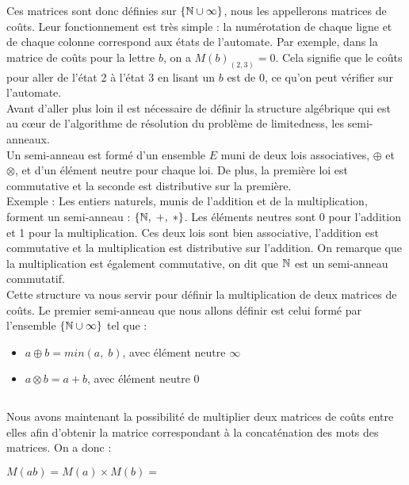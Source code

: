 \documentclass{report}
\begin{document}
Ces matrices sont donc définies sur $\{\mathbb{N} \cup \infty\}$, nous les appellerons matrices de coûts. Leur fonctionnement est très simple : la numérotation de chaque ligne et de chaque colonne correspond aux états de l'automate. Par exemple, dans la matrice de coûts pour la lettre $b$, on a $M(b)_{(2,3)}=0$. Cela signifie que le coûts pour aller de l'état 2 à l'état 3 en lisant un $b$ est de 0, ce qu'on peut vérifier sur l'automate. \\

Avant d'aller plus loin il est nécessaire de définir la structure algébrique qui est au cœur de l'algorithme de résolution du problème de limitedness, les semi-anneaux.\\
Un semi-anneau est formé d'un ensemble $E$ muni de deux lois associatives, $\oplus$ et $\otimes$, et d'un élément neutre pour chaque loi. De plus, la première loi est commutative et la seconde est distributive sur la première.\\
Exemple : Les entiers naturels, munis de l'addition et de la multiplication, forment un semi-anneau : $\{ \mathbb{N},\;+,\;* \}$. Les éléments neutres sont 0 pour l'addition et 1 pour la multiplication. Ces deux lois sont bien associative, l'addition est commutative et la multiplication est distributive sur l'addition. On remarque que la multiplication est également commutative, on dit que $\mathbb{N}$ est un semi-anneau commutatif.\\

Cette structure va nous servir pour définir la multiplication de deux matrices de coûts. Le premier semi-anneau que nous allons définir est celui formé par l'ensemble $\{\mathbb{N} \cup \infty\}$ tel que :
\begin{itemize}
\item $a \oplus b = min(a,\;b)$, avec élément neutre $\infty$
\item $a \otimes b = a + b$, avec élément neutre $0$
\end{itemize}
$\ $

Nous avons maintenant la possibilité de multiplier deux matrices de coûts entre elles afin d'obtenir la matrice correspondant à la concaténation des mots des matrices. On a donc :
\begin{center}
$M(ab) = M(a) \times M(b) =$
\end{center}
$\ $
\end{document}
